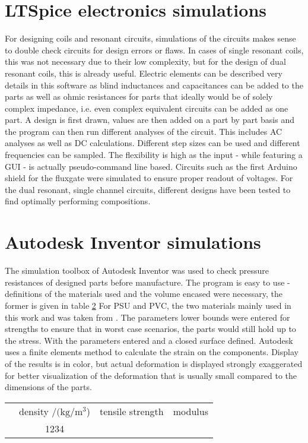     \section{LTSpice electronics simulations}
        For designing coils and resonant circuits, simulations of the circuits makes sense to double check circuits for design errors or flaws. In cases of single resonant coils, this was not necessary due to their low complexity, but for the design of dual resonant coils, this is already useful. Electric elements can be described very details in this software as blind inductances and capacitances can be added to the parts as well as ohmic resistances for parts that ideally would be of solely complex impedance, i.e. even complex equivalent circuits can be added as one part.
        A design is first drawn, values are then added on a part by part basis and the program can then run different analyses of the circuit. This includes AC analyses as well as DC calculations. Different step sizes can be used and different frequencies can be sampled. The flexibility is high as the input - while featuring a GUI - is actually pseudo-command line based. Circuits such as the first Arduino shield for the fluxgate were simulated to ensure proper readout of voltages. For the dual resonant, single channel circuits, different designs have been tested to find optimally performing compositions.
    \section{Autodesk Inventor simulations}
        The simulation toolbox of Autodesk Inventor was used to check pressure resistances of designed parts before manufacture. The program is easy to use - definitions of the materials used and the volume encased were necessary, the former is given in table \ref{} For PSU and PVC, the two materials mainly used in this work and was taken from . The parameters lower bounds were entered for strengths to ensure that in worst case scenarios, the parts would still hold up to the stress. With the parameters entered and a closed surface defined. Autodesk uses a finite elements method to calculate the strain on the components. Display of the results is in color, but actual deformation is displayed strongly exaggerated for better visualization of the deformation that is usually small compared to the dimensions of the parts.
        \begin{table}
            \centering
            \begin{tabular}{cccc}
                & density /$(\si{\kg}/\si{\meter\cubed}$) & tensile strength & modulus \\
                & 1234 & 
            \end{tabular}
        \end{table}
